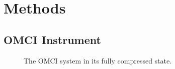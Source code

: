 \section{Methods}
\label{chap:omci:methods}

\subsection{OMCI Instrument}
\begin{figure}[]
    \begin{center}
    \end{center}
    \caption{The \ac{OMCI} system in its fully compressed state. } 
    \label{fig:OMCISystem}
\end{figure} 


